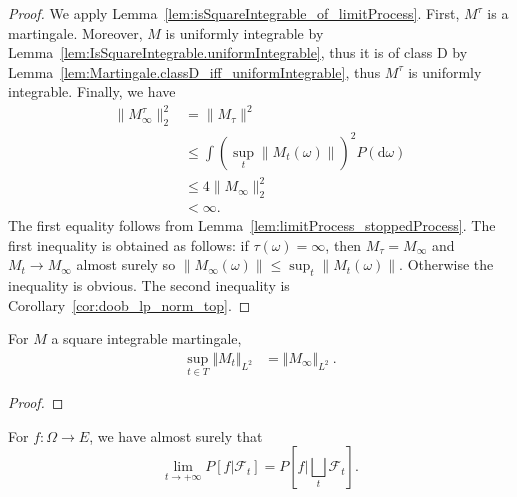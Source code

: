 \begin{proof}
  \leanok
We apply Lemma~\ref{lem:isSquareIntegrable_of_limitProcess}. First, $M^\tau$ is a martingale. Moreover, $M$ is uniformly integrable by Lemma~\ref{lem:IsSquareIntegrable.uniformIntegrable}, thus it is of class D by Lemma~\ref{lem:Martingale.classD_iff_uniformIntegrable}, thus $M^\tau$ is uniformly integrable. Finally, we have
\begin{align*}
  \|M^\tau_\infty\|_2^2 & = \|M_\tau\|^2 \\
  & \le \int (\sup_t \|M_t(\omega)\|)^2 P(\mathrm d\omega) \\
  & \le 4 \|M_\infty\|^2_2 \\
  & < \infty.
\end{align*}
The first equality follows from Lemma~\ref{lem:limitProcess_stoppedProcess}. The first inequality is obtained as follows: if $\tau(\omega) = \infty$, then $M_\tau = M_\infty$ and $M_t \longrightarrow M_\infty$ almost surely so $\|M_\infty(\omega)\| \le \sup_t \|M_t(\omega)\|$. Otherwise the inequality is obvious. The second inequality is Corollary~\ref{cor:doob_lp_norm_top}.
\end{proof}


\begin{lemma}\label{lem:IsSquareIntegrable.sup_eLpNorm_eq_eLpNorm_limitProcess}
  \leanok
For $M$ a square integrable martingale,
\begin{align*}
  \sup_{t \in T} \Vert M_t \Vert_{L^2}
  &= \Vert M_\infty \Vert_{L^2}
  \: .
\end{align*}
\end{lemma}

\begin{proof}

\end{proof}

\begin{lemma}\label{lem:tendsto_ae_condExp}
  \leanok
  For $f : \Omega \to E$, we have almost surely that
  \begin{equation*}
    \lim_{t \to +\infty} P[f | \mathcal{F}_t] = P\left[f | \bigsqcup_t \mathcal{F}_t\right].
  \end{equation*}
\end{lemma}

